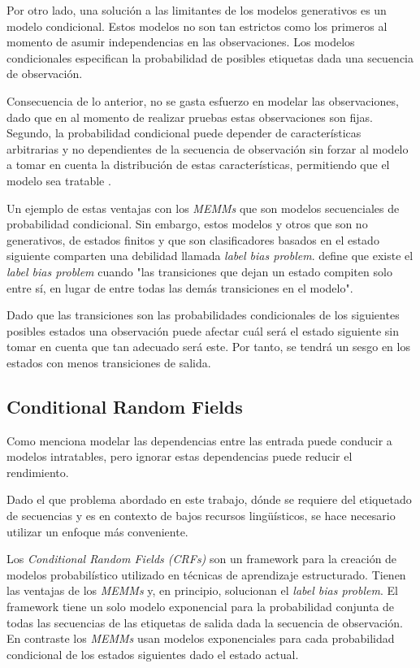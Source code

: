 \documentclass[letterpaper,12pt,oneside]{book}
\begin{document}
	
	Por otro lado, una solución a las limitantes de los modelos generativos es un modelo condicional. Estos modelos no son tan estrictos como los primeros al momento de asumir independencias en las observaciones. Los modelos condicionales especifican la probabilidad de posibles etiquetas dada una secuencia de observación.

	
	Consecuencia de lo anterior, no se gasta esfuerzo en modelar las observaciones, dado que en al momento de realizar pruebas estas observaciones son fijas. Segundo, la probabilidad condicional puede depender de características arbitrarias y no dependientes de la secuencia de observación sin forzar al modelo a tomar en cuenta la distribución de estas características, permitiendo que el modelo sea tratable \citep{lafferty2001conditional}.

	
	Un ejemplo de estas ventajas con los \textit{MEMMs} que son modelos secuenciales de probabilidad condicional. Sin embargo, estos modelos y otros que son no generativos, de estados finitos y que son clasificadores basados en el estado siguiente comparten una debilidad llamada \emph{label bias problem}. \citet{lafferty2001conditional} define que existe el \emph{label bias problem} cuando "las transiciones que dejan un estado compiten solo entre sí, en lugar de entre todas las demás transiciones en el modelo".

	
	Dado que las transiciones son las probabilidades condicionales de los siguientes posibles estados una observación puede afectar cuál será el estado siguiente sin tomar en cuenta que tan adecuado será este. Por tanto, se tendrá un sesgo en los estados con menos transiciones de salida.

	
	\subsection{Conditional Random Fields}

	
	Como menciona \citet{sutton2012introduction} modelar las dependencias entre las entrada puede conducir a modelos intratables, pero ignorar estas dependencias puede reducir el rendimiento.

	
	Dado el que problema abordado en este trabajo, dónde se requiere del etiquetado de secuencias y es en contexto de bajos recursos lingüísticos, se hace necesario utilizar un enfoque más conveniente.

	
	Los \textit{Conditional Random Fields (CRFs)} son un framework para la creación de modelos probabilístico utilizado en técnicas de aprendizaje estructurado. Tienen las ventajas de los \textit{MEMMs} y, en principio, solucionan el \emph{label bias problem}. El framework tiene un solo modelo exponencial para la probabilidad conjunta de todas las secuencias de las etiquetas de salida dada la secuencia de observación. En contraste los \emph{MEMMs} usan modelos exponenciales para cada probabilidad condicional de los estados siguientes dado el estado actual.
\end{document}
